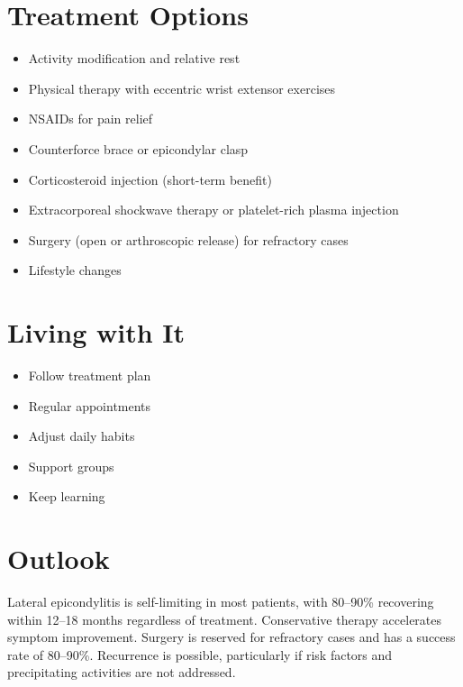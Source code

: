\section{Treatment Options}
\begin{itemize}[noitemsep]
  \item Activity modification and relative rest
  \item Physical therapy with eccentric wrist extensor exercises
  \item NSAIDs for pain relief
  \item Counterforce brace or epicondylar clasp
  \item Corticosteroid injection (short-term benefit)
  \item Extracorporeal shockwave therapy or platelet-rich plasma injection
  \item Surgery (open or arthroscopic release) for refractory cases
  \item Lifestyle changes
\end{itemize}

\section{Living with It}
\begin{itemize}[noitemsep]
  \item Follow treatment plan
  \item Regular appointments
  \item Adjust daily habits
  \item Support groups
  \item Keep learning
\end{itemize}

\section{Outlook}
Lateral epicondylitis is self-limiting in most patients, with 80--90\% recovering within 12--18 months regardless of treatment. Conservative therapy accelerates symptom improvement. Surgery is reserved for refractory cases and has a success rate of 80--90\%. Recurrence is possible, particularly if risk factors and precipitating activities are not addressed.
